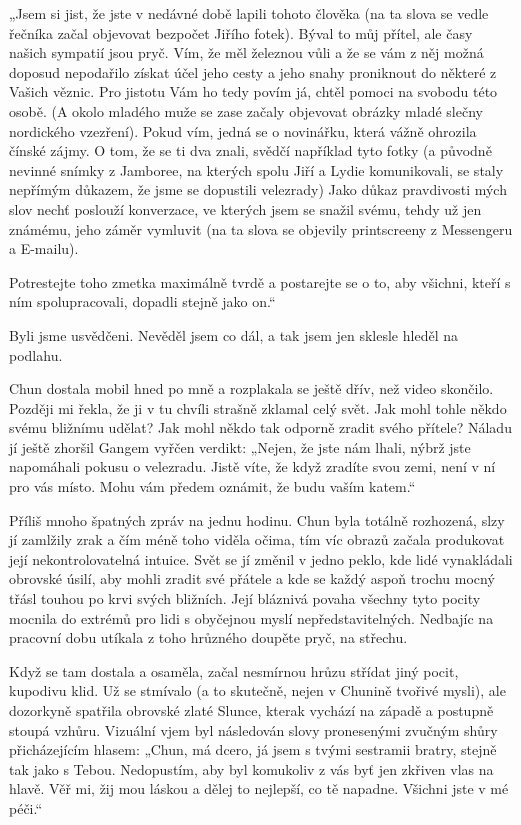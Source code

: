 „Jsem si jist, že jste v nedávné době lapili tohoto člověka (na ta slova se vedle řečníka začal objevovat bezpočet Jiřího fotek). Býval to můj přítel, ale časy našich sympatií jsou pryč. Vím, že měl železnou vůli a že se vám z něj možná doposud nepodařilo získat účel jeho cesty a jeho snahy proniknout do některé z Vašich věznic. Pro jistotu Vám ho tedy povím já, chtěl pomoci na svobodu této osobě. (A okolo mladého muže se zase začaly objevovat obrázky mladé slečny nordického vzezření). Pokud vím, jedná se o novinářku, která vážně ohrozila čínské zájmy. O tom, že se ti dva znali, svědčí například tyto fotky (a původně nevinné snímky z Jamboree, na kterých spolu Jiří a Lydie komunikovali, se staly nepřímým důkazem, že jsme se dopustili velezrady) Jako důkaz pravdivosti mých slov nechť poslouží konverzace, ve kterých jsem se snažil svému, tehdy už jen známému, jeho záměr vymluvit (na ta slova se objevily printscreeny z Messengeru a E-mailu).		

Potrestejte toho zmetka maximálně tvrdě a postarejte se o to, aby všichni, kteří s ním spolupracovali, dopadli stejně jako on.“

Byli jsme usvědčeni. Nevěděl jsem co dál, a tak jsem jen sklesle hleděl na podlahu.

Chun dostala mobil hned po mně a rozplakala se ještě dřív, než video skončilo. Později mi řekla, že ji v tu chvíli strašně zklamal celý svět. Jak mohl tohle někdo svému bližnímu udělat? Jak mohl někdo tak odporně zradit svého přítele? Náladu jí ještě zhoršil Gangem vyřčen verdikt: „Nejen, že jste nám lhali, nýbrž jste napomáhali pokusu o velezradu. Jistě víte, že když zradíte svou zemi, není v ní pro vás místo. Mohu vám předem oznámit, že budu vaším katem.“
 
Příliš mnoho špatných zpráv na jednu hodinu. Chun byla totálně rozhozená, slzy jí zamlžily zrak a čím méně toho viděla očima, tím víc obrazů začala produkovat její nekontrolovatelná intuice. Svět se jí změnil v jedno peklo, kde lidé vynakládali obrovské úsilí, aby mohli zradit své přátele a kde se každý aspoň trochu mocný třásl touhou po krvi svých bližních. Její bláznivá povaha všechny tyto pocity mocnila do extrémů pro lidi s obyčejnou myslí nepředstavitelných. Nedbajíc na pracovní dobu utíkala z toho hrůzného doupěte pryč, na střechu.	

Když se tam dostala a osaměla, začal nesmírnou hrůzu střídat jiný pocit, kupodivu klid. Už se stmívalo (a to skutečně, nejen v Chunině tvořivé mysli), ale dozorkyně spatřila obrovské zlaté Slunce, kterak vychází na západě a postupně stoupá vzhůru. Vizuální vjem byl následován slovy pronesenými zvučným shůry přicházejícím hlasem: „Chun, má dcero, já jsem s tvými sestramii bratry, stejně tak jako s Tebou. Nedopustím, aby byl komukoliv z vás byť jen zkřiven vlas na hlavě. Věř mi, žij mou láskou a dělej to nejlepší, co tě napadne. Všichni jste v mé péči.“

